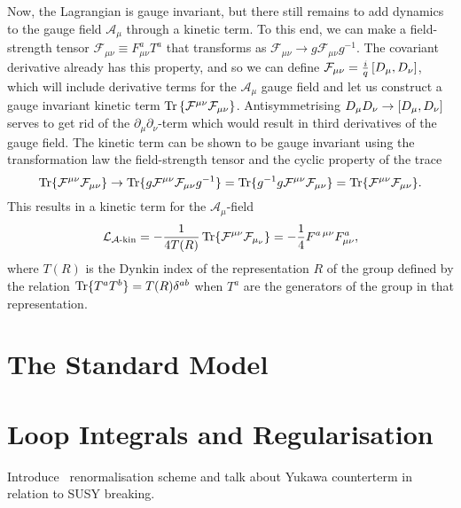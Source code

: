 \documentclass[../main.tex]{subfiles}
\begin{document}
Now, the Lagrangian is gauge invariant, but there still remains to add dynamics
to the gauge field \(\mathcal{A}_\mu\) through a kinetic term.
To this end, we can make a field-strength tensor \(\mathcal{F}_{\mu\nu} \equiv
F_{\mu\nu}^a T^a\) that transforms as \(\mathcal{F}_{\mu\nu} \to g
\mathcal{F}_{\mu\nu} g^{-1}\).
The covariant derivative already has this property, and so we can define
\(\mathcal{F}_{\mu\nu} = \frac{i}{q} \left[D_\mu,D_\nu\right]\), which will include
derivative terms for the \(\mathcal{A}_\mu\) gauge field and let us construct a
gauge invariant kinetic term \(\operatorname{Tr}\left\{\mathcal{F}^{\mu\nu} \mathcal{F}_{\mu\nu}\right\}\).
Antisymmetrising \(D_\mu D_\nu \to \left[D_\mu,D_\nu\right]\) serves to get rid of the \(\partial_\mu \partial_\nu\)-term which would result in third derivatives of the gauge field.
The kinetic term can be shown to be gauge invariant using the transformation law the field-strength tensor and the cyclic property of the trace
\begin{equation}
  \operatorname{Tr}\{\mathcal{F}^{\mu\nu} \mathcal{F}_{\mu\nu}\} \to
  \operatorname{Tr}\{g \mathcal{F}^{\mu\nu} \mathcal{F}_{\mu\nu} g^{-1}\} =
  \operatorname{Tr}\{g^{-1} g \mathcal{F}^{\mu\nu} \mathcal{F}_{\mu\nu}\} =
  \operatorname{Tr}\{\mathcal{F}^{\mu\nu} \mathcal{F}_{\mu\nu}\}.
\end{equation}
This results in a kinetic term for the \(\mathcal{A}_\mu\)-field
\begin{equation}
  \label{qft:eq:Akin}
  \mathcal{L}_{\mathcal{A}\text{-kin}} = -\frac{1}{4T(R)} \operatorname{Tr}\{\mathcal{F}^{\mu\nu} \mathcal{F}_{\mu_\nu}\} = -\frac{1}{4} F^{a\,\mu\nu} F^a_{\mu\nu},
\end{equation}
where \(T(R)\) is the Dynkin index of the representation \(R\) of the group defined by the relation \(\operatorname{Tr}\{T^a T^b\} = T(R) \delta^{ab}\) when \(T^a\) are the generators of the group in that representation.




\section{The Standard Model}




\section{Loop Integrals and Regularisation}
\begin{TODO}
  \item Introduce \DRbar\ renormalisation scheme and talk about Yukawa counterterm in relation to SUSY breaking.
\end{TODO}
\end{document}
